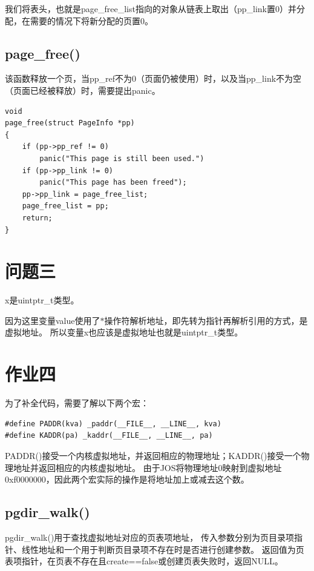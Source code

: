 \documentclass[12pt,a4paper,UTF8]{article}
\begin{document}
    我们将表头，也就是page\_free\_list指向的对象从链表上取出（pp\_link置0）并分配，在需要的情况下将新分配的页置0。

    \subsection{page\_free()}

    该函数释放一个页，当pp\_ref不为0（页面仍被使用）时，以及当pp\_link不为空（页面已经被释放）时，需要提出panic。

    \begin{lstlisting}[style=CPP]
void
page_free(struct PageInfo *pp)
{
    if (pp->pp_ref != 0)
        panic("This page is still been used.")
    if (pp->pp_link != 0) 
		panic("This page has been freed");
	pp->pp_link = page_free_list;
	page_free_list = pp;
	return; 
}
    \end{lstlisting}


\section{问题三}

x是uintptr\_t类型。

因为这里变量value使用了$*$操作符解析地址，即先转为指针再解析引用的方式，是虚拟地址。
所以变量x也应该是虚拟地址也就是uintptr\_t类型。

\section{作业四}
\setcounter{table}{0}
\setcounter{figure}{0}

    为了补全代码，需要了解以下两个宏：

    \begin{lstlisting}[style=CPP]
#define PADDR(kva) _paddr(__FILE__, __LINE__, kva)
#define KADDR(pa) _kaddr(__FILE__, __LINE__, pa)
    \end{lstlisting}

    PADDR()接受一个内核虚拟地址，并返回相应的物理地址；KADDR()接受一个物理地址并返回相应的内核虚拟地址。
    由于JOS将物理地址0映射到虚拟地址0xf0000000，因此两个宏实际的操作是将地址加上或减去这个数。

    \subsection{pgdir\_walk()}

    pgdir\_walk()用于查找虚拟地址对应的页表项地址，
    传入参数分别为页目录项指针、线性地址和一个用于判断页目录项不存在时是否进行创建参数。
    返回值为页表项指针，在页表不存在且create==false或创建页表失败时，返回NULL。
    
\end{document}
